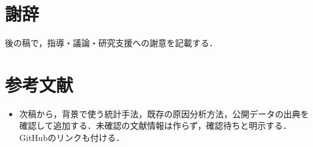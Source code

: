 \section*{謝辞}
\noindent 後の稿で，指導・議論・研究支援への謝意を記載する．

\section*{参考文献}
\begin{itemize}
    \item 次稿から，背景で使う統計手法，既存の原因分析方法，公開データの出典を確認して追加する．未確認の文献情報は作らず，確認待ちと明示する．GitHubのリンクも付ける．
\end{itemize}
